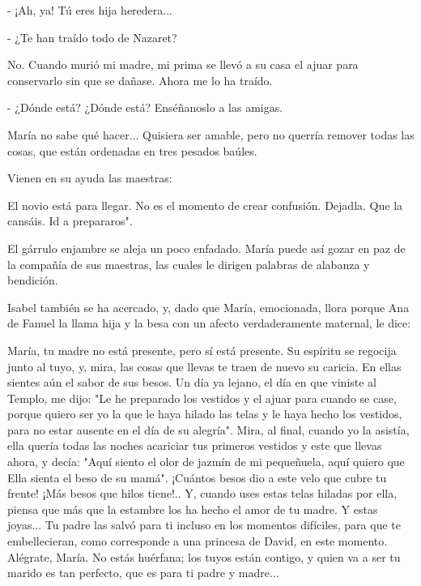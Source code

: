 \documentclass[12pt, twoside, openright]{book} %
\begin{document}
- ¡Ah, ya! Tú eres hija heredera... 

- ¿Te han traído todo de Nazaret? 

No. Cuando murió mi madre, mi prima se llevó a su casa el ajuar para conservarlo sin que se dañase. Ahora me lo ha traído. 

- ¿Dónde está? ¿Dónde está? Enséñanoslo a las amigas. 

María no sabe qué hacer... Quisiera ser amable, pero no querría remover todas las cosas, que están ordenadas en tres pesados baúles. 

Vienen en su ayuda las maestras: 

El novio está para llegar. No es el momento de crear confusión. Dejadla. Que la cansáis. Id a prepararos". 

El gárrulo enjambre se aleja un poco enfadado. María puede así gozar en paz de la compañía de sus maestras, las cuales le dirigen palabras de alabanza y bendición. 

Isabel también se ha acercado, y, dado que María, emocionada, llora porque Ana de Fanuel la llama hija y la besa con un afecto verdaderamente maternal, le dice: 

María, tu madre no está presente, pero sí está presente. Su espíritu se regocija junto al tuyo, y, mira, las cosas que llevas te traen de nuevo su caricia. En ellas sientes aún el sabor de sus besos. Un día ya lejano, el día en que viniste al Templo, me dijo: "Le he preparado los vestidos y el ajuar para cuando se case, porque quiero ser yo la que le haya hilado las telas y le haya hecho los vestidos, para no estar ausente en el día de su alegría". Mira, al final, cuando yo la asistía, ella quería todas las noches acariciar tus primeros vestidos y este que llevas ahora, y decía: "Aquí siento el olor de jazmín de mi pequeñuela, aquí quiero que Ella sienta el beso de su mamá". ¡Cuántos besos dio a este velo que cubre tu frente! ¡Más besos que hilos tiene!.. Y, cuando uses estas telas hiladas por ella, piensa que más que la estambre los ha hecho el amor de tu madre. Y estas joyas... Tu padre las salvó para ti incluso en los momentos difíciles, para que te embellecieran, como corresponde a una princesa de David, en este momento. Alégrate, María. No estás huérfana; los tuyos están contigo, y quien va a ser tu marido es tan perfecto, que es para ti padre y madre... 
\end{document}
